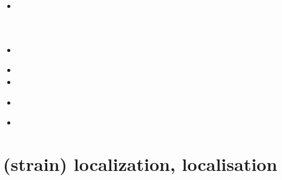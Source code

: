\begin{small}
\begin{itemize}
\item[\twothousandtwenty] 
 \\
 \\
 \\
\item[\twothousandtwentyone] 
 \\
\item[\twothousandtwentytwo] 
\item[\twothousandtwentythree] 
\item[\twothousandtwentyfour] 
 \\
\item[\twothousandtwentysix] 
\end{itemize}
\end{small}






\section{(strain) localization, localisation}

